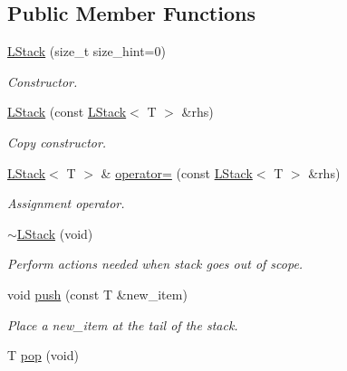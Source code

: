 \subsection*{Public Member Functions}
\begin{DoxyCompactItemize}
\item 
\hyperlink{classMadara_1_1Utility_1_1LStack_a065f5e6773b3ac07e1889a8a5d81843f}{LStack} (size\_\-t size\_\-hint=0)
\begin{DoxyCompactList}\small\item\em Constructor. \item\end{DoxyCompactList}\item 
\hyperlink{classMadara_1_1Utility_1_1LStack_a3efe588095fc865168db096f3fdded09}{LStack} (const \hyperlink{classMadara_1_1Utility_1_1LStack}{LStack}$<$ T $>$ \&rhs)
\begin{DoxyCompactList}\small\item\em Copy constructor. \item\end{DoxyCompactList}\item 
\hyperlink{classMadara_1_1Utility_1_1LStack}{LStack}$<$ T $>$ \& \hyperlink{classMadara_1_1Utility_1_1LStack_a5ddda2f0beca08b8107e124963f51a9a}{operator=} (const \hyperlink{classMadara_1_1Utility_1_1LStack}{LStack}$<$ T $>$ \&rhs)
\begin{DoxyCompactList}\small\item\em Assignment operator. \item\end{DoxyCompactList}\item 
\hyperlink{classMadara_1_1Utility_1_1LStack_a2c997d0b7bd9fde9ee9fe53c5eb54ae0}{$\sim$LStack} (void)
\begin{DoxyCompactList}\small\item\em Perform actions needed when stack goes out of scope. \item\end{DoxyCompactList}\item 
void \hyperlink{classMadara_1_1Utility_1_1LStack_ac3a82ca0966cfb7758957d4210eba431}{push} (const T \&new\_\-item)
\begin{DoxyCompactList}\small\item\em Place a {\itshape new\_\-item\/} at the tail of the stack. \item\end{DoxyCompactList}\item 
T \hyperlink{classMadara_1_1Utility_1_1LStack_a198875d7fab15902d85698e08548b9eb}{pop} (void)

\end{DoxyCompactItemize}
